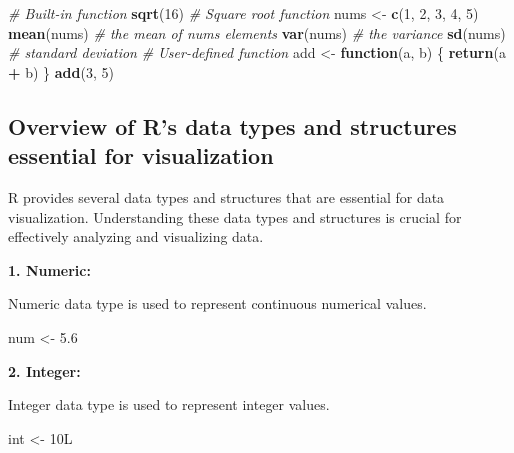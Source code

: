 \documentclass[
]{book}
\newenvironment{Shaded}{\begin{snugshade}}{\end{snugshade}}
\newcommand{\CommentTok}[1]{\textcolor[rgb]{0.56,0.35,0.01}{\textit{#1}}}
\newcommand{\ControlFlowTok}[1]{\textcolor[rgb]{0.13,0.29,0.53}{\textbf{#1}}}
\newcommand{\DataTypeTok}[1]{\textcolor[rgb]{0.13,0.29,0.53}{#1}}
\newcommand{\DecValTok}[1]{\textcolor[rgb]{0.00,0.00,0.81}{#1}}
\newcommand{\FloatTok}[1]{\textcolor[rgb]{0.00,0.00,0.81}{#1}}
\newcommand{\FunctionTok}[1]{\textcolor[rgb]{0.13,0.29,0.53}{\textbf{#1}}}
\newcommand{\NormalTok}[1]{#1}
\newcommand{\OtherTok}[1]{\textcolor[rgb]{0.56,0.35,0.01}{#1}}
\newcommand{\SpecialCharTok}[1]{\textcolor[rgb]{0.81,0.36,0.00}{\textbf{#1}}}
\begin{document}
\begin{Shaded}
\begin{Highlighting}[]
\CommentTok{\# Built{-}in function}
\FunctionTok{sqrt}\NormalTok{(}\DecValTok{16}\NormalTok{)   }\CommentTok{\# Square root function}
\NormalTok{nums }\OtherTok{\textless{}{-}} \FunctionTok{c}\NormalTok{(}\DecValTok{1}\NormalTok{, }\DecValTok{2}\NormalTok{, }\DecValTok{3}\NormalTok{, }\DecValTok{4}\NormalTok{, }\DecValTok{5}\NormalTok{)}
\FunctionTok{mean}\NormalTok{(nums) }\CommentTok{\# the mean of nums elements}
\FunctionTok{var}\NormalTok{(nums) }\CommentTok{\# the variance}
\FunctionTok{sd}\NormalTok{(nums) }\CommentTok{\# standard deviation}
\CommentTok{\# User{-}defined function}
\NormalTok{add }\OtherTok{\textless{}{-}} \ControlFlowTok{function}\NormalTok{(a, b) \{}
  \FunctionTok{return}\NormalTok{(a }\SpecialCharTok{+}\NormalTok{ b)}
\NormalTok{\}}
\FunctionTok{add}\NormalTok{(}\DecValTok{3}\NormalTok{, }\DecValTok{5}\NormalTok{)}
\end{Highlighting}
\end{Shaded}

\subsection{Overview of R's data types and structures essential for visualization}\label{overview-of-rs-data-types-and-structures-essential-for-visualization}

R provides several data types and structures that are essential for data visualization. Understanding these data types and structures is crucial for effectively analyzing and visualizing data.

\textbf{1. Numeric:}

Numeric data type is used to represent continuous numerical values.

\begin{Shaded}
\begin{Highlighting}[]
\NormalTok{num }\OtherTok{\textless{}{-}} \FloatTok{5.6}
\end{Highlighting}
\end{Shaded}

\textbf{2. Integer:}

Integer data type is used to represent integer values.

\begin{Shaded}
\begin{Highlighting}[]
\NormalTok{int }\OtherTok{\textless{}{-}} \DecValTok{10}\DataTypeTok{L}
\end{Highlighting}
\end{Shaded}
\end{document}
